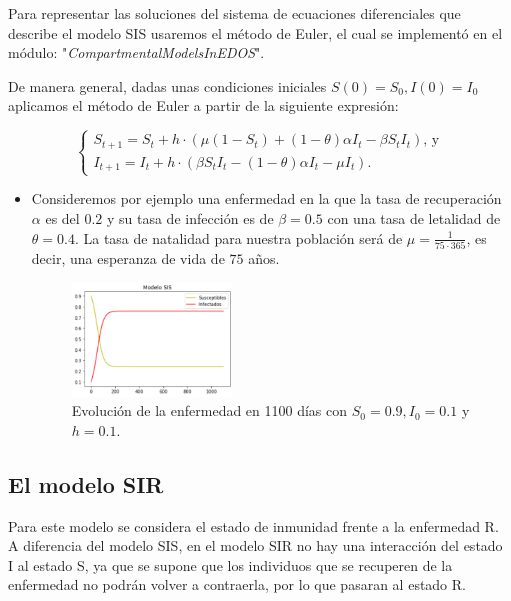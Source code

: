 Para representar las soluciones del sistema de ecuaciones diferenciales que describe el modelo SIS usaremos el método de Euler, el cual se implementó en el módulo: "\textit{CompartmentalModelsInEDOS}".

De manera general, dadas unas condiciones iniciales $S(0)=S_0,I(0)=I_0$ aplicamos el método de Euler a partir de la siguiente expresión:

$$\left\{\begin{array}{l}
S_{t+1} = S_t + h\cdot(\mu(1 - S_t) + (1 - \theta)\alpha I_t - \beta S_t I_t )\text{, y} \\
I_{t+1} = I_t + h\cdot(\beta S_t I_t - (1 - \theta)\alpha I_t - \mu I_t).
\end{array}\right.$$

\begin{itemize}
    \item Consideremos por ejemplo una enfermedad en la que la tasa de recuperación $\alpha$ es del $0.2$ y su tasa de infección es de $\beta=0.5$ con una tasa de letalidad de $\theta=0.4$. La tasa de natalidad para nuestra población será de $\mu=\frac{1}{75\cdot365}$, es decir, una esperanza de vida de $75$ años.
    
    \begin{figure}[h]
      \centering
        \includegraphics[width=0.4\textwidth]{Imagenes/ex1SIS.PNG}
      \caption{Evolución de la enfermedad en 1100 días con $S_0=0.9,I_0=0.1$ y $h=0.1$.}
      \label{fig:Ejemplo 1 - SIS}
    \end{figure}
\end{itemize}

\subsection{El modelo SIR}\label{sub:El modelo SIR}

Para este modelo se considera el estado de inmunidad frente a la enfermedad R. A diferencia del modelo SIS, en el modelo SIR no hay una interacción del estado I al estado S, ya que se supone que los individuos que se recuperen de la enfermedad no podrán volver a contraerla, por lo que pasaran al estado R. 

